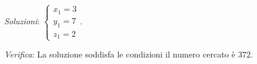\emph{Soluzioni}: \(\left\{\begin{array}{l}x_1=3\\y_1=7\\z_1=2\end{array}\right.\).

\emph{Verifica}: La soluzione soddisfa le condizioni il numero cercato è \(372\).

% 
% 
% 
